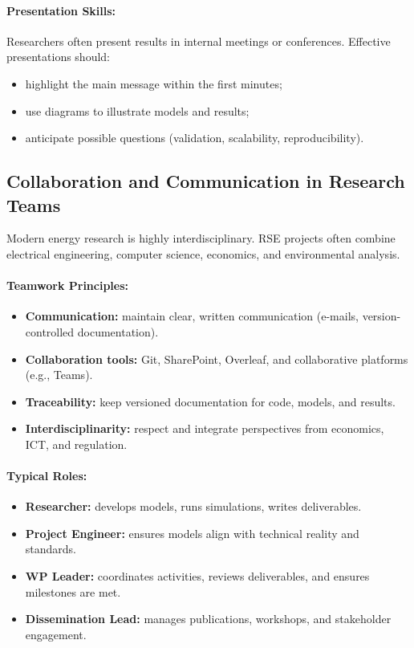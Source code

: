 \documentclass[11pt]{article}
\begin{document}
	\paragraph{Presentation Skills:}
	Researchers often present results in internal meetings or conferences.  
	Effective presentations should:
	\begin{itemize}
		\item highlight the main message within the first minutes;
		\item use diagrams to illustrate models and results;
		\item anticipate possible questions (validation, scalability, reproducibility).
	\end{itemize}
	
	
	\subsection{Collaboration and Communication in Research Teams}
	
	Modern energy research is highly interdisciplinary.  
	RSE projects often combine electrical engineering, computer science, economics, and environmental analysis.
	
	\paragraph{Teamwork Principles:}
	\begin{itemize}
		\item \textbf{Communication:} maintain clear, written communication (e-mails, version-controlled documentation).
		\item \textbf{Collaboration tools:} Git, SharePoint, Overleaf, and collaborative platforms (e.g., Teams).
		\item \textbf{Traceability:} keep versioned documentation for code, models, and results.
		\item \textbf{Interdisciplinarity:} respect and integrate perspectives from economics, ICT, and regulation.
	\end{itemize}
	
	\paragraph{Typical Roles:}
	\begin{itemize}
		\item \textbf{Researcher:} develops models, runs simulations, writes deliverables.
		\item \textbf{Project Engineer:} ensures models align with technical reality and standards.
		\item \textbf{WP Leader:} coordinates activities, reviews deliverables, and ensures milestones are met.
		\item \textbf{Dissemination Lead:} manages publications, workshops, and stakeholder engagement.
	\end{itemize}
	
\end{document}
